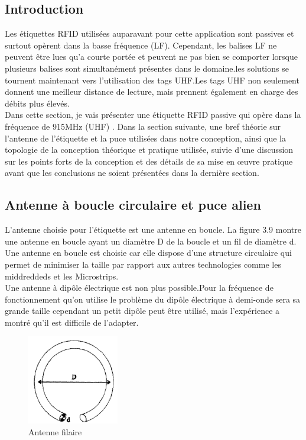 \documentclass[11pt, a4paper, twoside]{book}
\begin{document}
\subsection{Introduction}
Les étiquettes RFID utilisées auparavant pour cette application sont passives et surtout opèrent dans la basse fréquence (LF). Cependant, les balises LF ne peuvent être lues qu'a courte portée et peuvent ne pas bien se comporter lorsque plusieurs balises sont simultanément présentes dans le domaine.les solutions se tournent maintenant vers l'utilisation des tags UHF.Les tags UHF non seulement donnent une meilleur distance de lecture, mais prennent également en charge des débits plus élevés. \\

Dans cette section, je vais présenter  une étiquette RFID passive qui opère dans la fréquence de 915MHz (UHF) . Dans la section suivante, une bref  théorie  sur l'antenne de l'étiquette et la puce utilisées dans notre conception, ainsi que la topologie de la conception théorique et pratique utilisée, suivie d'une discussion sur les points forts de la conception et des détails de sa mise en œuvre pratique avant que les conclusions ne soient présentées dans la dernière section.\subsection{Antenne à boucle circulaire et puce alien}
L'antenne choisie pour l'étiquette  est une antenne en boucle. La figure 3.9 montre une antenne en boucle ayant un diamètre D de la boucle et un fil de diamètre d. Une antenne en boucle est choisie car elle dispose d'une structure circulaire qui permet de minimiser la taille par rapport aux autres technologies comme les middreddeds et les Microstrips.\\

Une antenne à dipôle électrique est non plus possible.Pour la fréquence de fonctionnement qu'on utilise le problème du dipôle électrique à demi-onde sera sa grande taille cependant un petit dipôle peut être utilisé, mais l'expérience a montré qu'il est difficile de l'adapter.
\begin{figure}[H]
\centering
\includegraphics[width=4cm]{cla}
\caption{Antenne filaire}
\end{figure}
\end{document}
